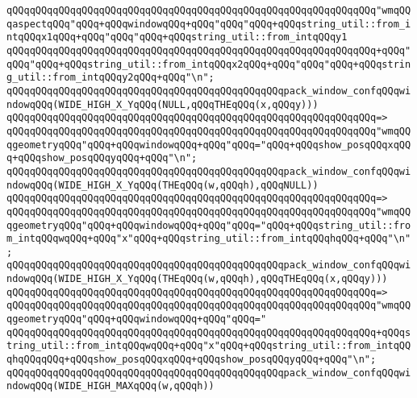 \verb|qQQqqQQqqQQqqQQqqQQqqQQqqQQqqQQqqQQqqQQqqQQqqQQqqQQqqQQqqQQqqQQq"wmqQQqaspectqQQq"qQQq+qQQqwindowqQQq+qQQq"qQQq"qQQq+qQQqstring_util::from_intqQQqx1qQQq+qQQq"qQQq"qQQq+qQQqstring_util::from_intqQQqy1|\newline
\verb|qQQqqQQqqQQqqQQqqQQqqQQqqQQqqQQqqQQqqQQqqQQqqQQqqQQqqQQqqQQqqQQq+qQQq"qQQq"qQQq+qQQqstring_util::from_intqQQqx2qQQq+qQQq"qQQq"qQQq+qQQqstring_util::from_intqQQqy2qQQq+qQQq"\n";|\newline
\newline
\verb|qQQqqQQqqQQqqQQqqQQqqQQqqQQqqQQqqQQqqQQqqQQqqQQqpack_window_confqQQqwindowqQQq(WIDE_HIGH_X_YqQQq(NULL,qQQqTHEqQQq(x,qQQqy)))|\newline
\verb|qQQqqQQqqQQqqQQqqQQqqQQqqQQqqQQqqQQqqQQqqQQqqQQqqQQqqQQqqQQqqQQq=>|\newline
\verb|qQQqqQQqqQQqqQQqqQQqqQQqqQQqqQQqqQQqqQQqqQQqqQQqqQQqqQQqqQQqqQQq"wmqQQqgeometryqQQq"qQQq+qQQqwindowqQQq+qQQq"qQQq="qQQq+qQQqshow_posqQQqxqQQq+qQQqshow_posqQQqyqQQq+qQQq"\n";|\newline
\newline
\verb|qQQqqQQqqQQqqQQqqQQqqQQqqQQqqQQqqQQqqQQqqQQqqQQqpack_window_confqQQqwindowqQQq(WIDE_HIGH_X_YqQQq(THEqQQq(w,qQQqh),qQQqNULL))|\newline
\verb|qQQqqQQqqQQqqQQqqQQqqQQqqQQqqQQqqQQqqQQqqQQqqQQqqQQqqQQqqQQqqQQq=>|\newline
\verb|qQQqqQQqqQQqqQQqqQQqqQQqqQQqqQQqqQQqqQQqqQQqqQQqqQQqqQQqqQQqqQQq"wmqQQqgeometryqQQq"qQQq+qQQqwindowqQQq+qQQq"qQQq="qQQq+qQQqstring_util::from_intqQQqwqQQq+qQQq"x"qQQq+qQQqstring_util::from_intqQQqhqQQq+qQQq"\n";|\newline
\newline
\verb|qQQqqQQqqQQqqQQqqQQqqQQqqQQqqQQqqQQqqQQqqQQqqQQqpack_window_confqQQqwindowqQQq(WIDE_HIGH_X_YqQQq(THEqQQq(w,qQQqh),qQQqTHEqQQq(x,qQQqy)))|\newline
\verb|qQQqqQQqqQQqqQQqqQQqqQQqqQQqqQQqqQQqqQQqqQQqqQQqqQQqqQQqqQQqqQQq=>|\newline
\verb|qQQqqQQqqQQqqQQqqQQqqQQqqQQqqQQqqQQqqQQqqQQqqQQqqQQqqQQqqQQqqQQq"wmqQQqgeometryqQQq"qQQq+qQQqwindowqQQq+qQQq"qQQq="|\newline
\verb|qQQqqQQqqQQqqQQqqQQqqQQqqQQqqQQqqQQqqQQqqQQqqQQqqQQqqQQqqQQqqQQq+qQQqstring_util::from_intqQQqwqQQq+qQQq"x"qQQq+qQQqstring_util::from_intqQQqhqQQqqQQq+qQQqshow_posqQQqxqQQq+qQQqshow_posqQQqyqQQq+qQQq"\n";|\newline
\newline
\verb|qQQqqQQqqQQqqQQqqQQqqQQqqQQqqQQqqQQqqQQqqQQqqQQqpack_window_confqQQqwindowqQQq(WIDE_HIGH_MAXqQQq(w,qQQqh))|\newline
